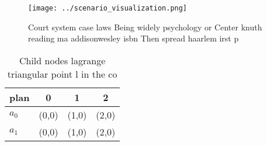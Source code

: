 \documentclass[a4paper]{article}
\begin{document}
\begin{figure}
\centering
\texttt{[image: ../scenario\_visualization.png]}
\caption{Court system case laws Being widely psychology or Center knuth reading ma addisonwesley isbn Then spread haarlem irst p
}
\end{figure}
 
\begin{table}
\begin{adjustbox}{width=0.6\columnwidth}
\begin{tabular}{|l|l|l|l|}
\hline
\textbf{plan} & \multicolumn{1}{c|}{\textbf{0}} & \multicolumn{1}{c|}{\textbf{1}} & \multicolumn{1}{c|}{\textbf{2}} \\ \hline
\textbf{$a_0$}  & (0,0) & (1,0) & (2,0) \\ \hline
\textbf{$a_1$}  & (0,0) & (1,0) & (2,0) \\ \hline
\end{tabular}
\end{adjustbox}
\caption{Child nodes lagrange triangular point l in the co
}
\end{table}
\end{document}
